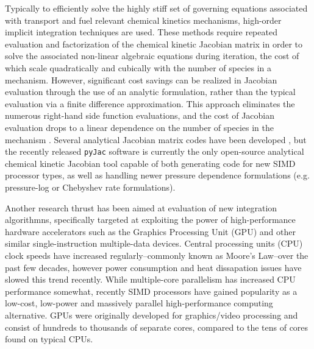 \documentclass[preprint,12pt]{elsarticle}
\begin{document}
Typically to efficiently solve the highly stiff set of governing equations associated with transport and fuel relevant chemical kinetics mechanisms, high-order implicit integration techniques are used.
These methods require repeated evaluation and factorization of the chemical kinetic Jacobian matrix in order to solve the associated non-linear algebraic equations during iteration, the cost of which scale quadratically and cubically with the number of species in a mechanism.
However, significant cost savings can be realized in Jacobian evaluation through the use of an analytic formulation, rather than the typical evaluation via a finite difference approximation.
This approach eliminates the numerous right-hand side function evaluations, and the cost of Jacobian evaluation drops to a linear dependence on the number of species in the mechanism \cite{Lu:2009gh}.
Several analytical Jacobian matrix codes have been developed \cite{Safta:2011vn,Youssefi:2011tm,Bisetti:2012jw,Perini:2012gy,Dijkmans:2014bb}, but the recently released \texttt{pyJac} \cite{Niemeyer:2015im,Niemeyer:2015ws} software is currently the only open-source analytical chemical kinetic Jacobian tool capable of both generating code for new SIMD processor types, as well as handling newer pressure dependence formulations (e.g. pressure-log or Chebyshev rate formulations).

Another research thrust has been aimed at evaluation of new integration algorithmns, specifically targeted at exploiting the power of high-performance hardware accelerators such as the Graphics Processing Unit (GPU) and other similar single-instruction multiple-data devices.
Central processing units (CPU) clock speeds have increased regularly--commonly known as Moore's Law--over the past few decades, however power consumption and heat dissapation issues have slowed this trend recently.
While multiple-core parallelism has increased CPU performance somewhat, recently SIMD processors have gained popularity as a low-cost, low-power and massively parallel high-performance computing alternative.
GPUs were originally developed for graphics/video processing and consist of hundreds to thousands of separate cores, compared to the tens of cores found on typical CPUs.
\end{document}
